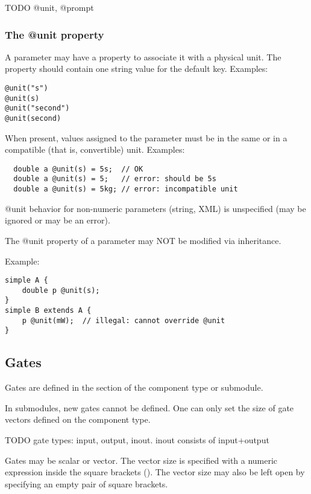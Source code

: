 TODO @unit, @prompt

\subsubsection{The @unit property}

A parameter may have a  property to associate it with a physical
unit. The  property should contain one string value for the default
key. Examples:

\begin{verbatim}
@unit("s")
@unit(s)
@unit("second")
@unit(second)
\end{verbatim}

When present, values assigned to the parameter must be in the
same or in a compatible (that is, convertible) unit.
Examples:

\begin{verbatim}
  double a @unit(s) = 5s;  // OK
  double a @unit(s) = 5;   // error: should be 5s
  double a @unit(s) = 5kg; // error: incompatible unit
\end{verbatim}

@unit behavior for non-numeric parameters (string, XML) is unspecified
(may be ignored or may be an error).

The @unit property of a parameter may NOT be modified via inheritance.

Example:
\begin{verbatim}
simple A {
    double p @unit(s);
}
simple B extends A {
    p @unit(mW);  // illegal: cannot override @unit
}
\end{verbatim}



\subsection{Gates}
\label{ch-ned-ref:sec:gates}

Gates are defined in the  section of the component type
or submodule.

In submodules, new gates cannot be defined. One can only set the size
of gate vectors defined on the component type.

TODO gate types: input, output, inout. inout consists of input+output

Gates may be scalar or vector. The vector size is specified with a
numeric expression inside the square brackets (\ttt{[...]}).
The vector size may also be left open by specifying an empty pair
of square brackets.

